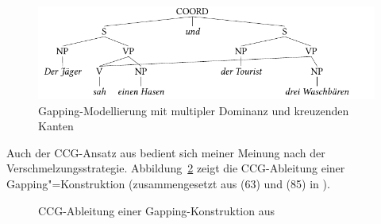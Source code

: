 \clearpage 
 
\begin{figure}[t]
\centering
\includegraphics{graphics/abb82.pdf}
\caption{\label{fig-ellipse-verschmelzung}Gapping-Modellierung mit multipler Dominanz und kreuzenden Kanten}
\end{figure} 
 
Auch der CCG-Ansatz aus \cite{Steedman:90} bedient sich meiner Meinung nach der Verschmelzungsstrategie. Abbildung~\ref{fig-ellipse-ccg} zeigt die CCG-Ableitung einer Gapping"=Konstruktion (zusammengesetzt aus (63) und (85) in \citealt{Steedman:90}). 
\begin{figure}[t]
\centering
\newcommand{\ccghspc}{-0.7em} 
\caption{\label{fig-ellipse-ccg}CCG-Ableitung einer Gapping-Konstruktion aus \citet[(63),(85)]{Steedman:90}}
\end{figure}
